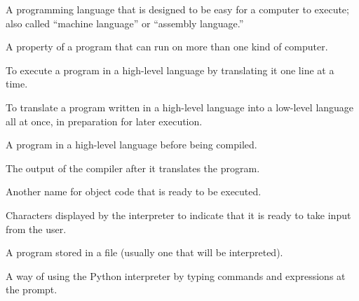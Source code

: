 \begin{vocabulary}  A programming language that is designed
	to be easy for a computer to execute; also called ``machine language'' or
	``assembly language.''
\end{vocabulary}
	
\begin{vocabulary}[portability:]  A property of a program that can run on more
	than one kind of computer.
\end{vocabulary}
	
\begin{vocabulary}[interpret:]  To execute a program in a high-level language
	by translating it one line at a time.
\end{vocabulary}
	
\begin{vocabulary}[compile:]  To translate a program written in a high-level language
	into a low-level language all at once, in preparation for later
	execution.
\end{vocabulary}
	
\begin{vocabulary}  A program in a high-level language before
	being compiled.
\end{vocabulary}
	
\begin{vocabulary}  The output of the compiler after it translates
	the program.
\end{vocabulary}
	
\begin{vocabulary}[executable:]  Another name for object code that is ready
	to be executed.
\end{vocabulary}
	
\begin{vocabulary}[prompt:] Characters displayed by the interpreter to indicate
	that it is ready to take input from the user.
\end{vocabulary}
	
\begin{vocabulary}[script:] A program stored in a file (usually one that will be
	interpreted).
\end{vocabulary}
	
\begin{vocabulary} A way of using the Python interpreter by
	typing commands and expressions at the prompt.
\end{vocabulary}
	
